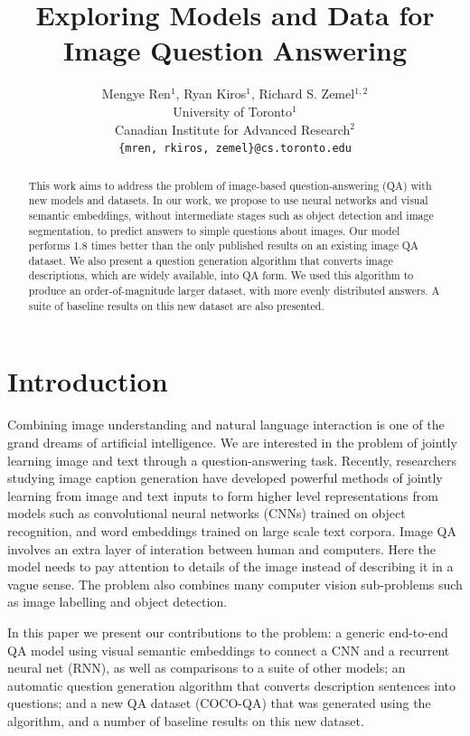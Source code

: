 \documentclass{article} %
\title{Exploring Models and Data for Image Question Answering}
\author{
Mengye Ren${}^1$, Ryan Kiros${}^1$, Richard S. Zemel${}^{1, 2}$\\
University of Toronto${}^1$\\
Canadian Institute for Advanced Research${}^2$\\
\texttt{\{mren, rkiros, zemel\}@cs.toronto.edu} \\
}
\renewcommand{\#}[1]{\textbf{#1}}
\begin{document}
\maketitle

\begin{abstract}

This work aims to address the problem of image-based question-answering (QA)
with new models and datasets. In our work, we propose to use neural networks
and visual semantic embeddings, without intermediate stages such as object
detection and image segmentation, to predict answers to simple questions about
images. Our model performs 1.8 times better than the only published results on
an existing image QA dataset. We also present a question generation algorithm
that converts image descriptions, which are widely available, into QA form. We
used this algorithm to produce an order-of-magnitude larger dataset, with more
evenly distributed answers. A suite of baseline results on this new dataset are
also presented.

\end{abstract}

\section{Introduction}

Combining image understanding and natural language interaction is one of the
grand dreams of artificial intelligence. We are interested in the problem of
jointly learning image and text through a question-answering task. Recently,
researchers studying image caption generation \cite{vinyals14,kiros14b,
karpathy14,mao14,donahue14,chen14,fang14,xu15,lebret15,klein15} have developed
powerful methods of jointly learning from image and text inputs to form higher
level representations from models such as convolutional neural networks (CNNs)
trained on object recognition, and word embeddings trained on large scale text
corpora. Image QA involves an extra layer of interation between human and
computers. Here the model needs to pay attention to details of the image
instead of describing it in a vague sense. The problem also combines many
computer vision sub-problems such as image labelling and object detection.

In this paper we present our contributions to the problem: a generic end-to-end
QA model using visual semantic embeddings to connect a CNN and a recurrent
neural net (RNN), as well as comparisons to a suite of other models; an
automatic question generation algorithm that converts description sentences
into questions; and a new QA dataset (COCO-QA) that was generated using the
algorithm, and a number of baseline results on this new dataset.
\end{document}

